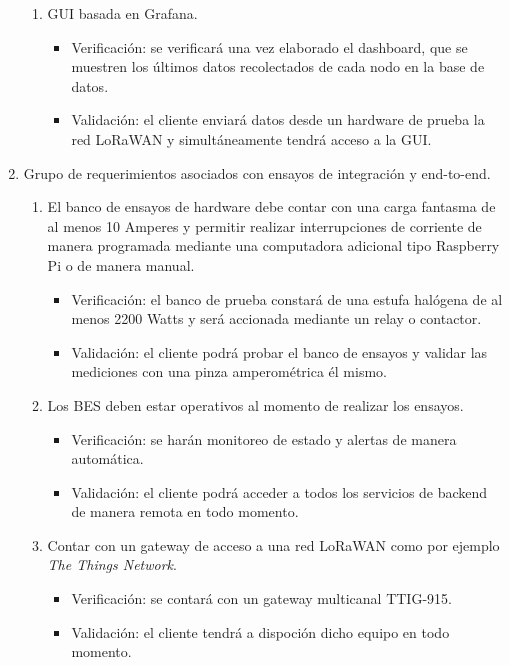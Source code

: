 \documentclass[11pt]{charter}
\begin{document}
\begin{enumerate}
\begin{enumerate}[label*=\arabic*.]
			\item GUI basada en Grafana.
			\begin{itemize}
				\item Verificación: se verificará una vez elaborado el dashboard, que se muestren los últimos datos recolectados de cada nodo en la base de datos.\\
				\item Validación: el cliente enviará datos desde un hardware de prueba la red LoRaWAN y simultáneamente tendrá acceso a la GUI.\\
			\end{itemize}
		\end{enumerate}
		
	\item Grupo de requerimientos asociados con ensayos de integración y end-to-end.
		\begin{enumerate}[label*=\arabic*.]
			\item El banco de ensayos de hardware debe contar con una carga fantasma de al menos
			10 Amperes y permitir realizar interrupciones de corriente de manera programada
			mediante una computadora adicional tipo Raspberry Pi o de manera manual.
			\begin{itemize}
				\item Verificación: el banco de prueba constará de una estufa halógena de al menos 2200 Watts y será accionada mediante un relay o contactor.\\
				\item Validación: el cliente podrá probar el banco de ensayos y validar las mediciones con una pinza amperométrica él mismo.\\
			\end{itemize}
			
			\item Los BES deben estar operativos al momento de realizar los ensayos.
			\begin{itemize}
				\item Verificación: se harán monitoreo de estado y alertas de manera automática.\\
				\item Validación: el cliente podrá acceder a todos los servicios de backend de manera remota en todo momento.\\
			\end{itemize}
			
			\item Contar con un gateway de acceso a una red LoRaWAN como por ejemplo \textit{The Things Network}.
			\begin{itemize}
				\item Verificación: se contará con un gateway multicanal TTIG-915.\\
				\item Validación: el cliente tendrá a dispoción dicho equipo en todo momento.\\
			\end{itemize}
		\end{enumerate}
\end{enumerate}
\end{document}
